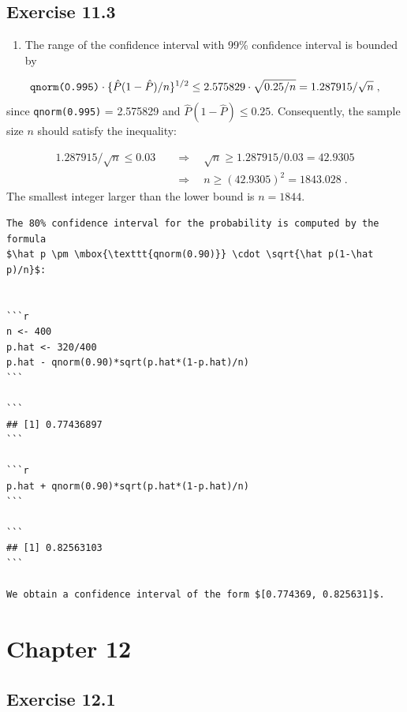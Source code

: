 \documentclass[]{krantz}
\providecommand{\tightlist}{%
  \setlength{\itemsep}{0pt}\setlength{\parskip}{0pt}}
\theoremstyle{definition}
\theoremstyle{definition}
\theoremstyle{definition}
\theoremstyle{remark}
\begin{document}
\hypertarget{exercise-11.3}{%
\subsection*{Exercise 11.3}\label{exercise-11.3}}


\begin{enumerate}
\def\labelenumi{\arabic{enumi}.}
\tightlist
\item
  The range of the confidence
  interval with 99\% confidence interval is bounded by
\end{enumerate}

\[\mbox{\texttt{qnorm(0.995)}}\cdot \{\hat P (1-\hat P)/n\}^{1/2} \leq 2.575829 \cdot \sqrt{0.25/n} = 1.287915/\sqrt{n}\;,\]
since \texttt{qnorm(0.995)} = 2.575829 and \(\hat P (1-\hat P) \leq 0.25\).
Consequently, the sample size \(n\) should satisfy the inequality:

\[\begin{aligned}
1.287915/\sqrt{n} \leq 0.03\quad  &\Longrightarrow  \quad \sqrt{n} \geq 1.287915/0.03 = 42.9305\\
&\Longrightarrow \quad  n \geq (42.9305)^2 = 1843.028\;.\end{aligned}\]
The smallest integer larger than the lower bound is \(n=1844\).

\begin{verbatim}
The 80% confidence interval for the probability is computed by the formula
$\hat p \pm \mbox{\texttt{qnorm(0.90)}} \cdot \sqrt{\hat p(1-\hat p)/n}$:


```r
n <- 400
p.hat <- 320/400
p.hat - qnorm(0.90)*sqrt(p.hat*(1-p.hat)/n)
```

```
## [1] 0.77436897
```

```r
p.hat + qnorm(0.90)*sqrt(p.hat*(1-p.hat)/n)
```

```
## [1] 0.82563103
```

We obtain a confidence interval of the form $[0.774369, 0.825631]$.
\end{verbatim}

\hypertarget{chapter-12}{%
\section*{Chapter 12}\label{chapter-12}}


\hypertarget{exercise-12.1}{%
\subsection*{Exercise 12.1}\label{exercise-12.1}}
\end{document}
